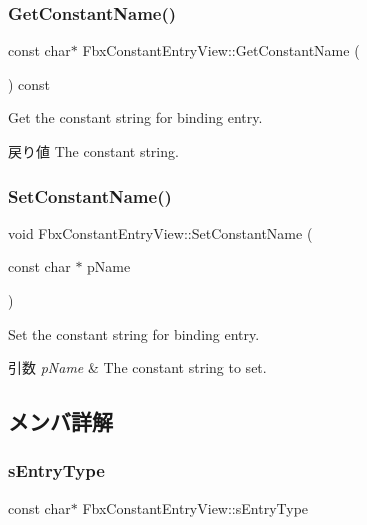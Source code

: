 \subsubsection{\texorpdfstring{Get\+Constant\+Name()}{GetConstantName()}}
{\footnotesize\ttfamily const char$\ast$ Fbx\+Constant\+Entry\+View\+::\+Get\+Constant\+Name (\begin{DoxyParamCaption}{ }\end{DoxyParamCaption}) const}

Get the constant string for binding entry. \begin{DoxyReturn}{戻り値}
The constant string. 
\end{DoxyReturn}
\mbox{\label{class_fbx_constant_entry_view_abe9370dc86bcdfb7b9ef617d2317f4b2}} 
\subsubsection{\texorpdfstring{Set\+Constant\+Name()}{SetConstantName()}}
{\footnotesize\ttfamily void Fbx\+Constant\+Entry\+View\+::\+Set\+Constant\+Name (\begin{DoxyParamCaption}\item[{const char $\ast$}]{p\+Name }\end{DoxyParamCaption})}

Set the constant string for binding entry. 
\begin{DoxyParams}{引数}
{\em p\+Name} & The constant string to set. \\
\hline
\end{DoxyParams}


\subsection{メンバ詳解}
\mbox{\label{class_fbx_constant_entry_view_a9613da66bae01aaedaf6a08f6f538126}} 
\subsubsection{\texorpdfstring{s\+Entry\+Type}{sEntryType}}
{\footnotesize\ttfamily const char$\ast$ Fbx\+Constant\+Entry\+View\+::s\+Entry\+Type\hspace{0.3cm}{\ttfamily [static]}}

